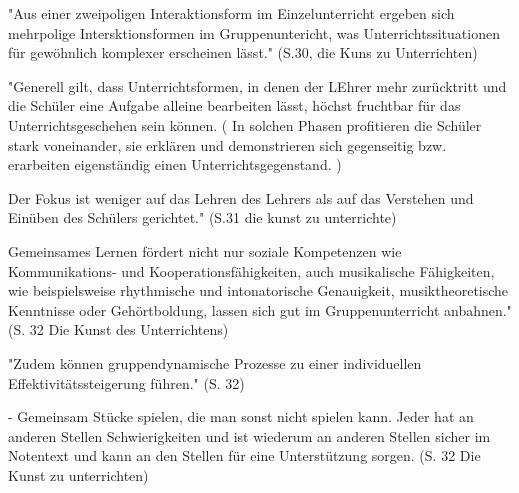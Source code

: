 







"Aus einer zweipoligen Interaktionsform im Einzelunterricht ergeben sich
mehrpolige Intersktionsformen im Gruppenuntericht, was Unterrichtssituationen
für gewöhnlich komplexer erscheinen lässt." (S.30, die Kuns zu Unterrichten)


"Generell gilt, dass Unterrichtsformen, in denen der LEhrer mehr zurücktritt und
die Schüler eine Aufgabe alleine bearbeiten lässt, höchst fruchtbar für das
Unterrichtsgeschehen sein können. ( In solchen Phasen profitieren die Schüler
stark voneinander, sie erklären und demonstrieren sich gegenseitig bzw.
erarbeiten eigenständig einen Unterrichtsgegenstand. ) 

Der Fokus ist weniger auf
das Lehren des Lehrers als auf das Verstehen und Einüben des Schülers
gerichtet."  (S.31 die kunst zu unterrichte)


Gemeinsames Lernen fördert nicht nur soziale Kompetenzen wie Kommunikations- und
Kooperationsfähigkeiten, auch musikalische Fähigkeiten, wie beispielsweise
rhythmische und intonatorische Genauigkeit, musiktheoretische Kenntnisse oder
Gehörtboldung, lassen sich gut im Gruppenunterricht anbahnen." (S. 32 Die Kunst
des Unterrichtens)

"Zudem können gruppendynamische Prozesse zu einer individuellen
Effektivitätssteigerung führen." (S. 32)

- Gemeinsam Stücke spielen, die man sonst nicht spielen kann. Jeder hat an
anderen Stellen Schwierigkeiten und ist wiederum an anderen Stellen sicher im
Notentext und kann an den Stellen für eine Unterstützung sorgen. (S. 32 Die
Kunst zu unterrichten)
